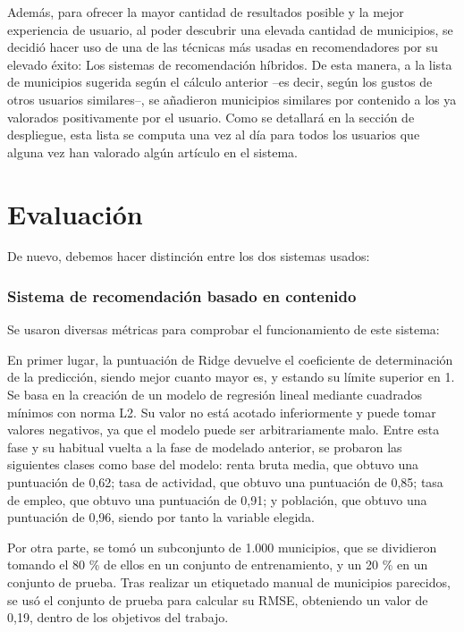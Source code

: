 Además, para ofrecer la mayor cantidad de resultados posible y la mejor experiencia de usuario, al poder descubrir una elevada cantidad de municipios, se decidió hacer uso de una de las técnicas más usadas en recomendadores por su elevado éxito: Los sistemas de recomendación híbridos. De esta manera, a la lista de municipios sugerida según el cálculo anterior –es decir, según los gustos de otros usuarios similares–, se añadieron municipios similares por contenido a los ya valorados positivamente por el usuario. Como se detallará en la sección de despliegue, esta lista se computa una vez al día para todos los usuarios que alguna vez han valorado algún artículo en el sistema.

\section{Evaluación}

De nuevo, debemos hacer distinción entre los dos sistemas usados:

\subsubsection{Sistema de recomendación basado en contenido}

Se usaron diversas métricas para comprobar el funcionamiento de este sistema:

En primer lugar, la puntuación de Ridge devuelve el coeficiente de determinación de la predicción, siendo mejor cuanto mayor es, y estando su límite superior en 1. Se basa en la creación de un modelo de regresión lineal mediante cuadrados mínimos con norma L2. Su valor no está acotado inferiormente y puede tomar valores negativos, ya que el modelo puede ser arbitrariamente malo. Entre esta fase y su habitual vuelta a la fase de modelado anterior, se probaron las siguientes clases como base del modelo: renta bruta media, que obtuvo una puntuación de 0,62; tasa de actividad, que obtuvo una puntuación de 0,85; tasa de empleo, que obtuvo una puntuación de 0,91; y población, que obtuvo una puntuación de 0,96, siendo por tanto la variable elegida.

Por otra parte, se tomó un subconjunto de 1.000 municipios, que se dividieron tomando el 80 \% de ellos en un conjunto de entrenamiento, y un 20 \% en un conjunto de prueba. Tras realizar un etiquetado manual de municipios parecidos, se usó el conjunto de prueba para calcular su RMSE, obteniendo un valor de 0,19, dentro de los objetivos del trabajo.

